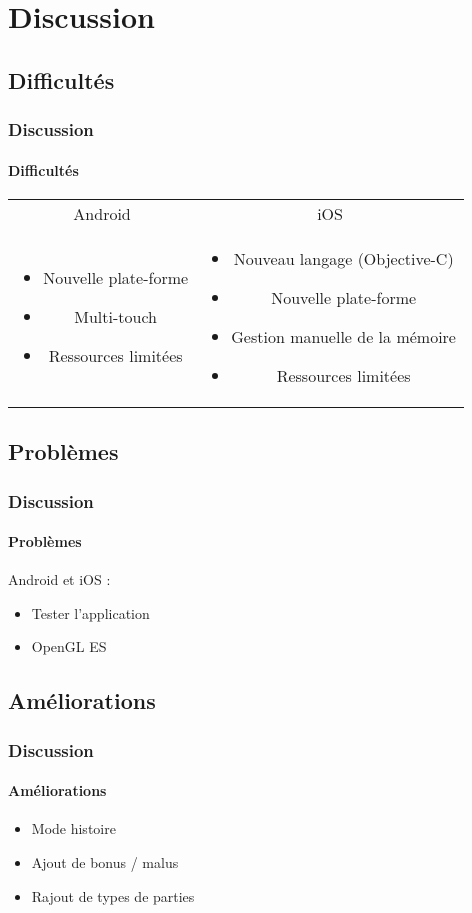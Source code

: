 \section{Discussion}

	\subsection{Difficultés}
		\begin{frame}
			\frametitle{Discussion}
			\framesubtitle{Difficultés}
				\begin{tabular}{cc}
					Android & iOS \\
					\begin{minipage}{5cm}
						\begin{itemize}
							\item Nouvelle plate-forme
							\item Multi-touch
							\item Ressources limitées
						\end{itemize}
					\end{minipage}
					&
					\begin{minipage}{5cm}
					\begin{itemize}
						\item Nouveau langage (Objective-C)
						\item Nouvelle plate-forme
						\item Gestion manuelle de la mémoire
						\item Ressources limitées
					\end{itemize}
				\end{minipage}
			\end{tabular}
		\end{frame}
		
		
	\subsection{Problèmes}
		\begin{frame}
			\frametitle{Discussion}
			\framesubtitle{Problèmes}
			Android et iOS :
			\begin{itemize}
				\item Tester l'application
				\item OpenGL ES
			\end{itemize}
		\end{frame}
		
		
	\subsection{Améliorations}
		\begin{frame}
			\frametitle{Discussion}
			\framesubtitle{Améliorations}
			\begin{itemize}
				\item Mode histoire
				\item Ajout de bonus / malus
				\item Rajout de types de parties
			\end{itemize}
		\end{frame}
